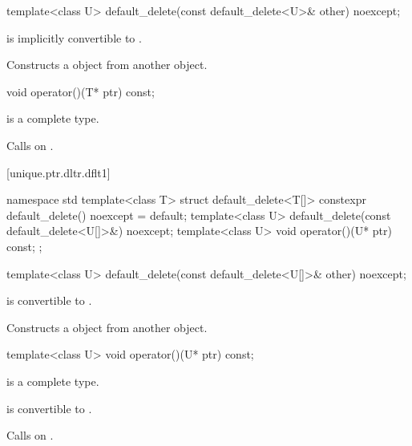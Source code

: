 %
\begin{itemdecl}
template<class U> default_delete(const default_delete<U>& other) noexcept;
\end{itemdecl}

\begin{itemdescr}
\pnum
\constraints
{} is implicitly convertible to .

\pnum
\effects
Constructs a  object
from another  object.
\end{itemdescr}

%
\begin{itemdecl}
void operator()(T* ptr) const;
\end{itemdecl}

\begin{itemdescr}
\pnum
\mandates
{} is a complete type.

\pnum
\effects
Calls  on .
\end{itemdescr}

[unique.ptr.dltr.dflt1]{}

\begin{codeblock}
namespace std {
  template<class T> struct default_delete<T[]> {
    constexpr default_delete() noexcept = default;
    template<class U> default_delete(const default_delete<U[]>&) noexcept;
    template<class U> void operator()(U* ptr) const;
  };
}
\end{codeblock}

\begin{itemdecl}
template<class U> default_delete(const default_delete<U[]>& other) noexcept;
\end{itemdecl}

\begin{itemdescr}
\pnum
\constraints
{} is convertible to .

\pnum
\effects
Constructs a  object from another  object.
\end{itemdescr}

%
\begin{itemdecl}
template<class U> void operator()(U* ptr) const;
\end{itemdecl}

\begin{itemdescr}
\pnum
\mandates
{} is a complete type.

\pnum
\constraints
{} is convertible to .

\pnum
\effects
Calls  on .
\end{itemdescr}

